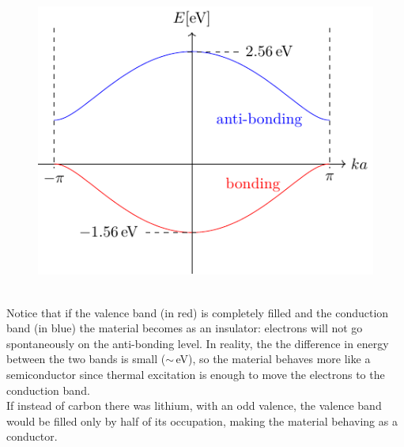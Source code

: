 \documentclass[10.75pt,a4paper,openright,bottom=2cm]{article}
\begin{document}
\begin{figure}[h]
    \centering
    \includegraphics{polybands.pdf}
    \label{fig:polybands}
\end{figure}\\
\noindent
Notice that if the valence band (in red) is completely filled and the conduction band (in blue) the material becomes as an insulator: electrons will not go spontaneously on the anti-bonding level. In reality, the the difference in energy between the two bands is small ($\sim$\,eV), so the material behaves more like a semiconductor since thermal excitation is enough to move the electrons to the conduction band.\\
If instead of carbon there was lithium, with an odd valence, the valence band would be filled only by half of its occupation, making the material behaving as a conductor.
\newpage
\end{document}
